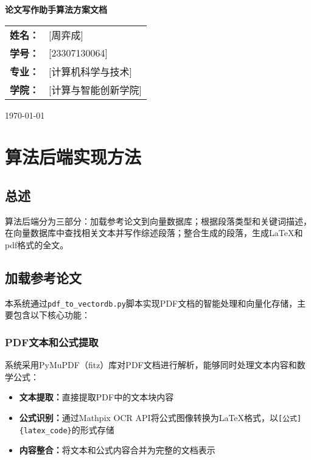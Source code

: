 \documentclass[12pt,a4paper]{article}
\begin{document}
\begin{titlepage}
    \centering
    \vspace*{2cm}
    
    {\Huge\bfseries 论文写作助手算法方案文档}
    
    \vspace{1.5cm}
    
    \vspace{3cm}
    
    \begin{tabular}{ll}
        \textbf{姓名：} & [周弈成] \\
        \textbf{学号：} & [23307130064] \\
        \textbf{专业：} & [计算机科学与技术] \\
        \textbf{学院：} & [计算与智能创新学院] \\
    \end{tabular}
    
    \vfill
    
    {\large \today}
\end{titlepage}

\tableofcontents
\newpage

\section{算法后端实现方法}
\subsection{总述}
算法后端分为三部分：加载参考论文到向量数据库；根据段落类型和关键词描述，在向量数据库中查找相关文本并写作综述段落；整合生成的段落，生成LaTeX和pdf格式的全文。

\subsection{加载参考论文}

本系统通过\texttt{pdf\_to\_vectordb.py}脚本实现PDF文档的智能处理和向量化存储，主要包含以下核心功能：

\subsubsection{PDF文本和公式提取}
系统采用PyMuPDF（fitz）库对PDF文档进行解析，能够同时处理文本内容和数学公式：
\begin{itemize}
    \item \textbf{文本提取：}直接提取PDF中的文本块内容
    \item \textbf{公式识别：}通过Mathpix OCR API将公式图像转换为LaTeX格式，以\texttt{[公式]\{latex\_code\}}的形式存储
    \item \textbf{内容整合：}将文本和公式内容合并为完整的文档表示
\end{itemize}
\end{document}
